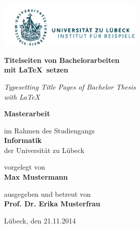 \documentclass{scrbook}
\begin{document}
\begin{titlepage}
  \thispagestyle{empty}

  \vspace{1cm}
  \includegraphics[height=22mm]{beispiel-logo.pdf}
  
  \vspace{2.5cm}
  \LARGE
  \textbf{\sffamily\color{maincolor}Titelseiten von Bachelorarbeiten\\
    mit \LaTeX\ setzen}

  \textit{Typesetting Title Pages of Bachelor Thesis\\
    with \LaTeX}

  \normalfont\normalsize
  \vspace{2em}
  \textbf{\sffamily\color{maincolor}Masterarbeit}

  im Rahmen des Studiengangs \\
  \textbf{\sffamily\color{maincolor}Informatik} \\
  der Universität zu Lübeck

  \vspace{1em}
  vorgelegt von \\
  \textbf{\sffamily\color{maincolor}Max Mustermann}

  \vspace{1em}
  ausgegeben und betreut von \\
  \textbf{\sffamily\color{maincolor}Prof. Dr. Erika Musterfrau}

  \vfill
  Lübeck, den 21.11.2014
\end{titlepage}
\end{document}
